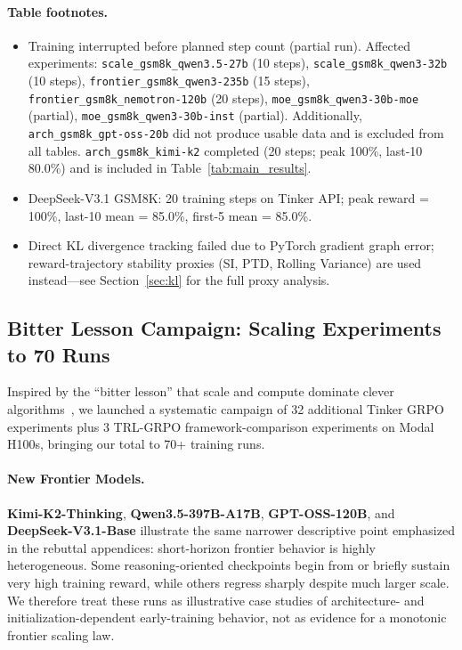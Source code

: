 \documentclass{article}
\begin{document}
\paragraph{Table footnotes.}
\begin{itemize}
    \item[$^\dagger$] Training interrupted before planned step count (partial run).
    Affected experiments:
    \texttt{scale\_gsm8k\_qwen3.5-27b} (10 steps), \texttt{scale\_gsm8k\_qwen3-32b} (10 steps),
    \texttt{frontier\_gsm8k\_qwen3-235b} (15 steps), \texttt{frontier\_gsm8k\_nemotron-120b} (20 steps),
    \texttt{moe\_gsm8k\_qwen3-30b-moe} (partial), \texttt{moe\_gsm8k\_qwen3-30b-inst} (partial).
    Additionally, \texttt{arch\_gsm8k\_gpt-oss-20b} did not produce usable data and is excluded
    from all tables. \texttt{arch\_gsm8k\_kimi-k2} completed (20 steps; peak 100\%, last-10 80.0\%)
    and is included in Table~\ref{tab:main_results}.
    \item[$^b$] DeepSeek-V3.1 GSM8K: 20 training steps on Tinker API;
    peak reward = 100\%, last-10 mean = 85.0\%, first-5 mean = 85.0\%.
    \item[$^h$] Direct KL divergence tracking failed due to PyTorch gradient graph error;
    reward-trajectory stability proxies (SI, PTD, Rolling Variance) are used
    instead---see Section~\ref{sec:kl} for the full proxy analysis.
\end{itemize}

\subsection{Bitter Lesson Campaign: Scaling Experiments to 70 Runs}
\label{sec:bitter_lesson}

Inspired by the ``bitter lesson'' that scale and compute dominate clever algorithms~\cite{schulman2017proximal}, we launched a systematic campaign of 32 additional Tinker GRPO experiments plus 3 TRL-GRPO framework-comparison experiments on Modal H100s, bringing our total to 70+ training runs.

\paragraph{New Frontier Models.}
\textbf{Kimi-K2-Thinking}, \textbf{Qwen3.5-397B-A17B}, \textbf{GPT-OSS-120B},
and \textbf{DeepSeek-V3.1-Base} illustrate the same narrower descriptive
point emphasized in the rebuttal appendices: short-horizon frontier behavior
is highly heterogeneous. Some reasoning-oriented checkpoints begin from or
briefly sustain very high training reward, while others regress sharply
despite much larger scale. We therefore treat these runs as illustrative case
studies of architecture- and initialization-dependent early-training
behavior, not as evidence for a monotonic frontier scaling law.
\end{document}
